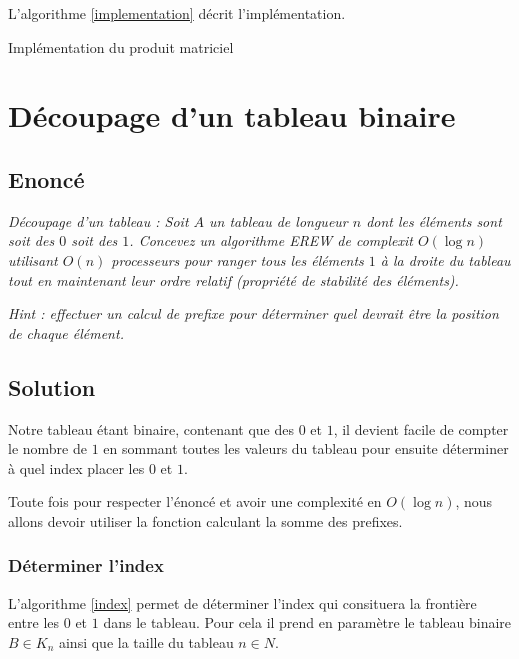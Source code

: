 \documentclass[oneside,11pt]{article}
\begin{document}
\begin{empfile}
L'algorithme \ref{implementation} décrit l'implémentation.

\incmargin{1em}
\begin{algorithm}
  \label{implementation}
  \caption{Implémentation du produit matriciel}
\end{algorithm}

\newpage

\section{Découpage d'un tableau binaire}

\subsection{Enoncé}

\textit{Découpage d'un tableau : Soit $A$ un tableau de longueur $n$ dont les éléments sont soit des $0$ soit des $1$. Concevez un algorithme EREW de complexit $O(\log{n})$ utilisant $O(n)$ processeurs pour ranger tous les éléments $1$ à la droite du tableau tout en maintenant leur ordre relatif (propriété de stabilité des éléments).}

\textit{Hint : effectuer un calcul de prefixe pour déterminer quel devrait être la position de chaque élément.}

\subsection{Solution}

Notre tableau étant binaire, contenant que des $0$ et $1$, il devient facile de compter le nombre de $1$ en sommant toutes les valeurs du tableau pour ensuite déterminer à quel index placer les $0$ et $1$.

Toute fois pour respecter l'énoncé et avoir une complexité en $O(\log{n})$, nous allons devoir utiliser la fonction calculant la somme des prefixes.

\subsubsection{Déterminer l'index}

L'algorithme \ref{index} permet de déterminer l'index qui consituera la frontière entre les $0$ et $1$ dans le tableau. Pour cela il prend en paramètre le tableau binaire $B \in K_n$ ainsi que la taille du tableau $n \in N$.


\end{empfile}
\end{document}
